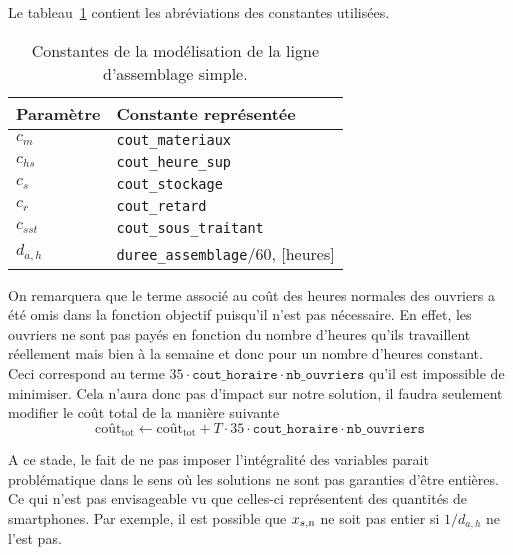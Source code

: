 Le tableau~\ref{tab:constantesQuestion1} contient les abréviations
des constantes utilisées.
\begin{table}[h]
  \begin{center}
  \begin{tabular}{|l|l|}
    \hline
    Paramètre & Constante représentée \\
    \hline
    \hline
    $c_m$ & \texttt{cout\_materiaux} \\
    \hline
    $c_{hs}$ & \texttt{cout\_heure\_sup} \\
    \hline
    $c_s$ & \texttt{cout\_stockage} \\
    \hline
    $c_r$ & \texttt{cout\_retard} \\
    \hline
    $c_{sst}$ & \texttt{cout\_sous\_traitant} \\
    \hline
    $d_{a,h}$ & \texttt{duree\_assemblage}/60, [heures] \\
    \hline
  \end{tabular}
  \caption{Constantes de la modélisation de la ligne d'assemblage simple.}
  \label{tab:constantesQuestion1}
  \end{center}
\end{table}

On remarquera que le terme associé au coût des heures normales des ouvriers
a été omis dans la fonction objectif puisqu'il n'est pas nécessaire.
En effet, les ouvriers ne sont pas payés en fonction du nombre
d'heures qu'ils travaillent réellement mais bien à la semaine et 
donc pour un nombre d'heures constant.
Ceci correspond au terme $35\cdot\texttt{cout\_horaire}\cdot
\texttt{nb\_ouvriers}$ qu'il est impossible de minimiser.
Cela n'aura donc pas d'impact sur notre solution,
il faudra seulement modifier le coût total de la manière suivante
\[ \text{coût}_\text{tot} \leftarrow \text{coût}_\text{tot} + T \cdot 35 \cdot\texttt{cout\_horaire}\cdot
\texttt{nb\_ouvriers} \]

A ce stade, le fait de ne pas imposer l'intégralité des variables
parait problématique dans le sens où les solutions ne sont pas 
garanties d'être entières. Ce qui n'est pas envisageable 
vu que celles-ci représentent des quantités de smartphones.
Par exemple, il est possible que
$x_{s,\text{n}}$ ne soit pas entier si $1/d_{a,h}$ ne l'est pas.